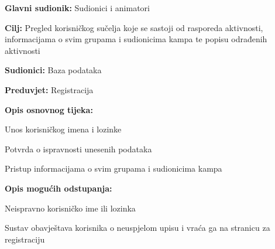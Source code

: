\noindent {}
\begin{packed_item}

	\item \textbf{Glavni sudionik: }Sudionici i animatori
	\item  \textbf{Cilj:} Pregled korisničkog sučelja koje se sastoji od rasporeda aktivnosti, informacijama o svim grupama i sudionicima kampa te popisu odrađenih aktivnosti
	\item  \textbf{Sudionici:} Baza podataka
	\item  \textbf{Preduvjet:} Registracija
	\item  \textbf{Opis osnovnog tijeka:}

	\item[] \begin{packed_enum}

				\item Unos korisničkog imena i lozinke
				\item Potvrda o ispravnosti unesenih podataka
				\item Pristup informacijama o svim grupama i sudionicima kampa
	\end{packed_enum}

	\item  \textbf{Opis mogućih odstupanja:}

	\item[] \begin{packed_item}

				\item[2.a] Neispravno korisničko ime ili lozinka
				\item[] \begin{packed_enum}

							\item Sustav obavještava korisnika o neuspjelom upisu i vraća ga na stranicu za registraciju
				\end{packed_enum}

	\end{packed_item}
\end{packed_item}
\vspace{5mm} %

